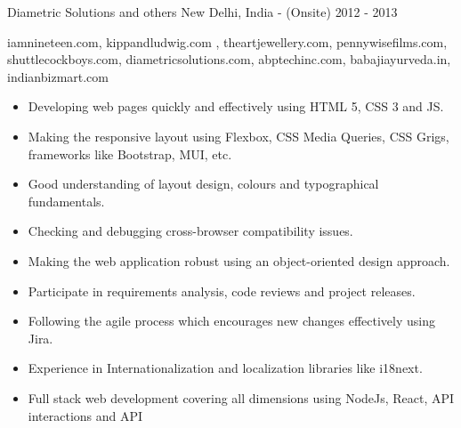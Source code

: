 \begin{projects}
    \project
    {Diametric Solutions and others} {New Delhi, India - (Onsite)} {2012 - 2013}
    {}
    {iamnineteen.com, kippandludwig.com , theartjewellery.com, pennywisefilms.com, shuttlecockboys.com, diametricsolutions.com, abptechinc.com, babajiayurveda.in, indianbizmart.com
    {\begin{itemize}
        \item Developing web pages quickly and effectively using HTML 5, CSS 3 and JS.
        \item Making the responsive layout using Flexbox, CSS Media Queries, CSS Grigs, frameworks like Bootstrap, MUI, etc.
        \item Good understanding of layout design, colours and typographical fundamentals.
        \item Checking and debugging cross-browser compatibility issues.
        \item Making the web application robust using an object-oriented design approach.
        \item Participate in requirements analysis, code reviews and project releases.
        \item Following the agile process which encourages new changes effectively using Jira.
        \item Experience in Internationalization and localization libraries like i18next.
        \item Full stack web development covering all dimensions using NodeJs, React, API interactions and API
    \end{itemize}} }
    {}
\end{projects}
